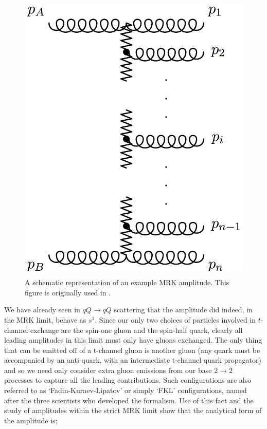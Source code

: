 \begin{figure}[t]
\centering
\includegraphics[scale=0.3]{Images/MRK_diagram.png} 
\caption{A schematic representation of an example MRK amplitude. This figure is originally used in \cite{Andersen2009a}.}
\label{fig:mrk}
\end{figure}

We have already seen in $qQ \to qQ$ scattering that the amplitude did indeed, in the MRK limit, behave as $s^1$. Since our only two choices of particles involved in $t$-channel exchange are the spin-one gluon and the spin-half quark, clearly all leading amplitudes in this limit must only have gluons exchanged. The only thing that can be emitted off of a t-channel gluon is another gluon (any quark must be accompanied by an anti-quark, with an intermediate t-channel quark propagator) and so we need only consider extra gluon emissions from our base $2 \to 2$ processes to capture all the leading contributions. Such configurations are also referred to as `Fadin-Kuraev-Lipatov' or simply `FKL' configurations, named after the three scientists who developed the formalism. Use of this fact and the study of amplitudes within the strict MRK limit \cite{DelDuca1995, Andersen2009a} show that the analytical form of the amplitude is;


